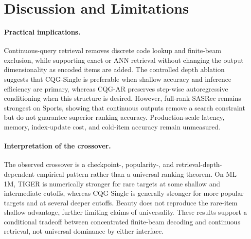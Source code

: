 \documentclass[letterpaper]{article}
\begin{document}
\section{Discussion and Limitations}

\paragraph{Practical implications.}
Continuous-query retrieval removes discrete code lookup and finite-beam
exclusion, while supporting exact or ANN retrieval without changing the
output dimensionality as encoded items are added. The controlled depth
ablation suggests that CQG-Single is preferable when shallow accuracy and
inference efficiency are primary, whereas CQG-AR preserves step-wise
autoregressive conditioning when this structure is desired. However,
full-rank SASRec remains strongest on Sports, showing that continuous
outputs remove a search constraint but do not guarantee superior ranking
accuracy. Production-scale latency, memory, index-update cost, and
cold-item accuracy remain unmeasured.


\paragraph{Interpretation of the crossover.}
The observed crossover is a checkpoint-, popularity-, and
retrieval-depth-dependent empirical pattern
rather than a universal ranking theorem. On ML-1M, TIGER is numerically
stronger for rare targets at some shallow and intermediate cutoffs, whereas
CQG-Single is generally stronger for more popular targets and at several
deeper cutoffs.
Beauty does not reproduce the rare-item shallow advantage,
further limiting claims of universality. These results support a conditional
tradeoff between concentrated finite-beam decoding and continuous retrieval,
not universal dominance by either interface. 

\end{document}
